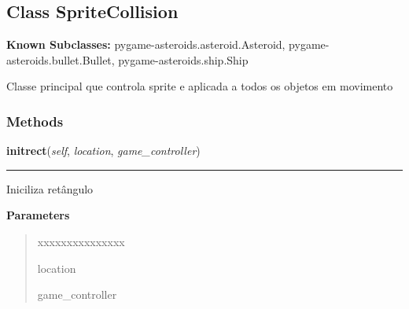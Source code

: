 \subsection{Class SpriteCollision}

    \label{pygame-asteroids:sprite_collision:SpriteCollision}
\textbf{Known Subclasses:}
pygame-asteroids.asteroid.Asteroid,
    pygame-asteroids.bullet.Bullet,
    pygame-asteroids.ship.Ship

Classe principal que controla sprite e aplicada a todos os objetos em 
movimento



  \subsubsection{Methods}

    \label{pygame-asteroids:sprite_collision:SpriteCollision:initrect}

    \vspace{0.5ex}

\hspace{.8\funcindent}\begin{boxedminipage}{\funcwidth}

    \raggedright \textbf{initrect}(\textit{self}, \textit{location}, \textit{game\_controller})

    \vspace{-1.5ex}

    \rule{\textwidth}{0.5\fboxrule}
\setlength{\parskip}{2ex}
    Iniciliza retângulo

\setlength{\parskip}{1ex}
      \textbf{Parameters}
      \vspace{-1ex}

      \begin{quote}
        \begin{Ventry}{xxxxxxxxxxxxxxx}

          \item[location]

          \item[game\_controller]

        \end{Ventry}

      \end{quote}

    \end{boxedminipage}

